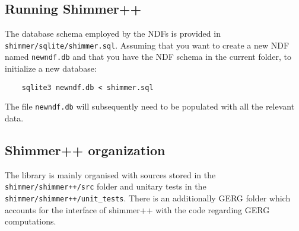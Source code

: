 
\subsection{Running Shimmer++}
The database schema employed by the NDFs is provided in \texttt{shimmer/sqlite/shimmer.sql}. Assuming that you want to create a new NDF named \texttt{newndf.db} and that you have the NDF schema in the current folder, to initialize a new database:
\begin{verbatim}
    sqlite3 newndf.db < shimmer.sql
\end{verbatim}
The file \texttt{newndf.db} will subsequently need to be populated with all the relevant data.

\subsection{Shimmer++ organization}
The library is mainly organised with sources stored in the \texttt{shimmer/shimmer++/src} folder and unitary tests in the \texttt{shimmer/shimmer++/unit\_tests}. There is an additionally GERG folder which accounts for the interface of shimmer++ with the code regarding GERG computations.



